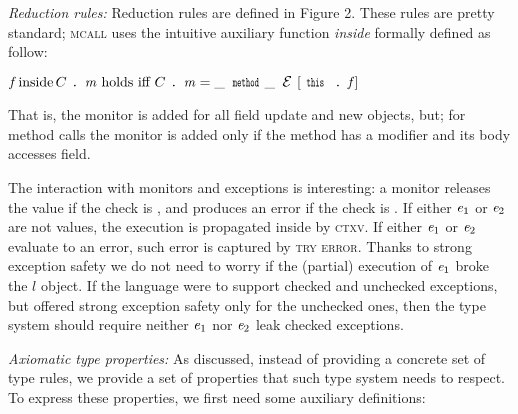 \loseSpace
\noindent\textit{Reduction rules:}
Reduction rules are defined in Figure 2.
These rules are pretty standard;
\textsc{mcall}
uses the intuitive auxiliary function \emph{inside}
formally defined as follow:

$%
\f\, \text{inside}\, C\singleDot\m\text{ holds iff }
C\singleDot\m=\_\,\Kw{method}\_\,\ctx[\Kw{this}\singleDot\f]
$


That is, the monitor is added for all field update and new objects, but;
for method calls the monitor is added only if the method has a \Q@mut@ modifier and its body accesses \Q@capsule@ field.

The interaction with monitors and exceptions is interesting:
a monitor releases the value if the check is \Q@true@, and produces an error if the 
check is \Q@false@.
If either ${\mathit{e}}_1$ or ${\mathit{e}}_2$ are not values, the execution is propagated inside
by \textsc{ctxv}.
If either ${\mathit{e}}_1$ or ${\mathit{e}}_2$ evaluate to an error, such error is captured by 
\textsc{try error}.
Thanks to strong exception safety
we do not need to worry
if the (partial) execution of ${\mathit{e}}_1$ broke the $l$ object.
If the language were to support checked and unchecked exceptions, but offered 
strong exception safety only for the unchecked ones, then 
the type system should require neither ${\mathit{e}}_1$ nor ${\mathit{e}}_2$ leak 
checked exceptions.








\loseSpace
\noindent\textit{Axiomatic type properties:}
As discussed, instead of providing a concrete set of type rules, we provide a set of properties
that such type system needs to respect.
To express these properties, we first need some auxiliary definitions:


